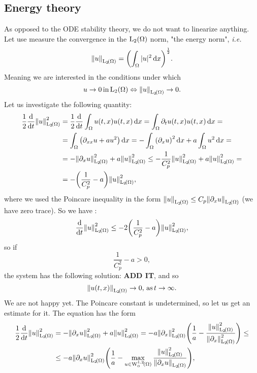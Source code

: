 \documentclass[reqno, a4paper]{article}
\begin{document}
\subsection{Energy theory}
\label{sec:energy_theory}
As opposed to the ODE stability theory, we do not want to linearize anything. Let use measure the convergence in the $\LpSet[2]{\Omega}$ norm, "the energy norm", \textit{i.e.}
\[
	\norm{u}_{\LpSet[2]{\Omega}} = \qty(\int_{\Omega}|u|^{2}\dd{x})^{\frac{1}{2}}.
\]
Meaning we are interested in the conditions under which
\[
	u \to 0 \, \text{in} \,\LpSet[2]{\Omega} \Leftrightarrow \norm{u}_{\LpSet[2]{\Omega}} \to 0.
\]
Let us investigate the following quantity:
\begin{align*}
	\frac{1}{2}\dv{t} \norm{u}_{\LpSet[2]{\Omega}}^{2} &= \frac{1}{2} \dv{t} \int_{\Omega}u\qty(t,x) u\qty(t,x)\dd{x} = \int_{\Omega}\partial_t u\qty(t,x) u\qty(t,x)\dd{x} =\\
							   &=\int_{\Omega}\qty( \partial_{xx}u+ a u^{2})\dd{x} = -\int_{\Omega}\qty(\partial_x u)^{2}\dd{x} + a \int_{\Omega}u^{2}\dd{x} = \\
							   & = -\norm{\partial_x u}_{\LpSet[2]{\Omega}}^{2} + a \norm{u}_{\LpSet[2]{\Omega}}^{2} \leq - \frac{1}{C_p^{2}}\norm{u}_{\LpSet[2]{\Omega}}^{2}+a \norm{u}_{\LpSet[2]{\Omega}}^{2} =\\
							   &=-\qty(\frac{1}{C_p^{2}}-a)\norm{u}_{\LpSet[2]{\Omega}}^{2},
\end{align*}
where we used the Poincare inequality in the form $\norm{u}_{\LpSet[2]{\Omega}} \leq C_p \norm{\partial_x u}_{\LpSet[2]{\Omega}}$ (we have zero trace). So we have :
\[
	\dv{t} \norm{u}_{\LpSet[2]{\Omega}}^{2} \leq -2\qty(\frac{1}{C_p^{2}}-a)\norm{u}_{\LpSet[2]{\Omega}}^{2},
\]
so if
\[
	\frac{1}{C_p^{2}}-a>0,
\]
the system has the following solution: \textbf{ADD IT}, and so
\[
	\norm{u(t,x)}_{\LpSet[2]{\Omega}} \to 0, \, \text{as} \, t\to \infty.
\]
We are not happy yet. The Poincare constant is undetermined, so let us get an estimate for it. The equation has the form
\begin{align*}
	\frac{1}{2}\dv{t} \norm{u}_{\LpSet[2]{\Omega}}^{2} &= - \norm{\partial_x u}_{\LpSet[2]{\Omega}}^{2}+a \norm{u}_{\LpSet[2]{\Omega}}^{2} = -a \norm{\partial_x}_{\LpSet[2]{\Omega}}^{2}\qty(\frac{1}{a}-\frac{\norm{u}_{\LpSet[2]{\Omega}}^{2}}{\norm{\partial_x}_{\LpSet[2]{\Omega}}^{2}}) \leq \\
	&\leq -a \norm{\partial_x u}_{\LpSet[2]{\Omega}}^{2}\qty(\frac{1}{a}-\max_{u \in \WkpzeroSet[1][2]{\Omega}}\frac{\norm{u}_{\LpSet[2]{\Omega}}^{2}}{\norm{\partial_x u}_{\LpSet[2]{\Omega}}}),
\end{align*}
\end{document}
